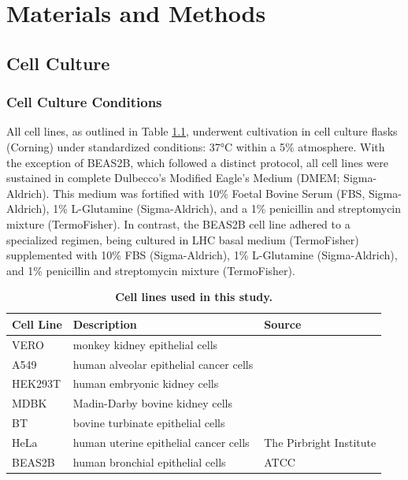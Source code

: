 \chapter{Materials and Methods} \label{ch:Materials and Methods}
\section{Cell Culture} \label{sec:Cell Culture}
\subsection{Cell Culture Conditions} \label{subsec:Cell Culture Conditions}
All cell lines, as outlined in Table \ref{tab:Cell Lines Table}, underwent cultivation in cell culture flasks (Corning) under standardized conditions: 37°C within a 5\%  atmosphere. With the exception of BEAS2B, which followed a distinct protocol, all cell lines were sustained in complete Dulbecco’s Modified Eagle's Medium (DMEM; Sigma-Aldrich). This medium was fortified with 10\% Foetal Bovine Serum (FBS, Sigma-Aldrich), 1\% L-Glutamine (Sigma-Aldrich), and a 1\% penicillin and streptomycin mixture (TermoFisher). In contrast, the BEAS2B cell line adhered to a specialized regimen, being cultured in LHC basal medium (TermoFisher) supplemented with 10\% FBS (Sigma-Aldrich), 1\% L-Glutamine (Sigma-Aldrich), and 1\% penicillin and streptomycin mixture (TermoFisher).

\begin{table}
  \centering
  \begin{tabular}{lll}
    \toprule
    {\textbf{Cell Line}} &
  {\textbf{Description}} &
  {\textbf{Source}} \\ \midrule
    VERO & monkey kidney epithelial cells & \\ 
    A549 & human alveolar epithelial cancer cells &   \\
    HEK293T & human embryonic kidney cells &  \\ 
    MDBK & Madin-Darby bovine kidney cells &  \\
    BT & bovine turbinate epithelial cells &  \\
    HeLa & human uterine epithelial cancer cells &
    \multirow{-6}{*}{The Pirbright Institute}
    \\
    BEAS2B & human bronchial epithelial cells & ATCC  \\ \bottomrule
  \end{tabular}
  \caption[Cell lines used in this study.]{\textbf{Cell lines used in this study.}}
  \label{tab:Cell Lines Table}
\end{table}

